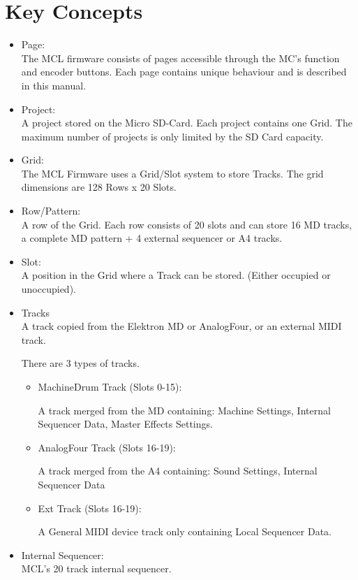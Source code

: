 \chapter{Key Concepts}

\begin{itemize}
\item Page:
\\
The MCL firmware consists of pages accessible through the MC's function and encoder buttons. Each page contains unique behaviour and is described in this manual.
\item Project:
\\
A project stored on the Micro SD-Card. Each project contains one Grid. 
The maximum number of projects is only limited by the SD Card capacity.

\item Grid:
\\
The MCL Firmware uses a Grid/Slot system to store Tracks. 
The grid dimensions are 128 Rows x 20 Slots. 

\item Row/Pattern:
\\
A row of the Grid. Each row consists of 20 slots and can store 16 MD tracks, a complete MD pattern + 4 external sequencer or A4 tracks.

\item Slot:
\\
A position in the Grid where a Track can be stored. (Either occupied or unoccupied).

\item Tracks
\\
A track copied from the Elektron MD or AnalogFour, or an external MIDI track.

There are 3 types of tracks.
\begin{itemize}

\item MachineDrum Track (Slots 0-15):

A track merged from the MD containing: Machine Settings, Internal Sequencer Data, Master Effects Settings.
\item AnalogFour Track (Slots 16-19):

A track merged from the A4 containing: Sound Settings, Internal Sequencer Data
\item Ext Track (Slots 16-19):

A General MIDI device track only containing Local Sequencer Data.
\end{itemize}

\item Internal Sequencer:\\
MCL's 20 track internal sequencer.


\end{itemize}
